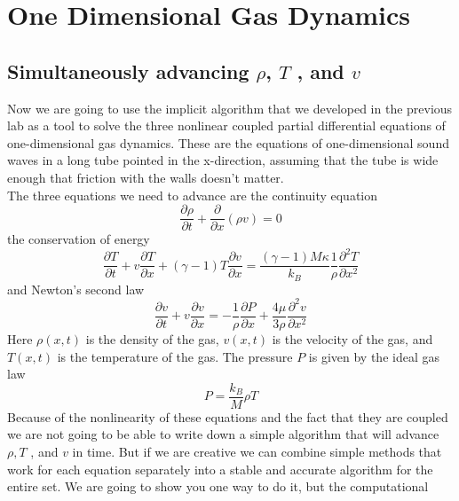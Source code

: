 
\chapter*{One Dimensional Gas Dynamics}
\section*{Simultaneously advancing $\rho$, $T$ , and $v$}
Now we are going to use the implicit algorithm that we developed in the previous
lab as a tool to solve the three nonlinear coupled partial differential equations
of one-dimensional gas dynamics. These are the equations of one-dimensional
sound waves in a long tube pointed in the x-direction, assuming that the tube is
wide enough that friction with the walls doesn\rq t matter. \\ 
The three equations we need to advance are the continuity equation
\begin{equation}\label{eq:1101}
\frac{\partial \rho}{\partial t}+\frac{\partial}{\partial x}(\rho v)=0
\end{equation}
the conservation of energy
\begin{equation}\label{eq:1102}
\frac{\partial T}{\partial t}+v \frac{\partial T}{\partial x}+(\gamma-1) T \frac{\partial v}{\partial x}=\frac{(\gamma-1) M \kappa}{k_{B}} \frac{1}{\rho} \frac{\partial^{2} T}{\partial x^{2}}
\end{equation}
and Newton\rq s second law
\begin{equation}\label{eq:1103}
\frac{\partial v}{\partial t}+v \frac{\partial v}{\partial x}=-\frac{1}{\rho} \frac{\partial P}{\partial x}+\frac{4 \mu}{3 \rho} \frac{\partial^{2} v}{\partial x^{2}}
\end{equation}
Here $\rho(x,t)$ is the density of the gas, $v(x,t)$ is the velocity of the gas, and $T(x,t)$ is
the temperature of the gas. The pressure $P$ is given by the ideal gas law
\begin{equation}\label{eq:1104}
P=\frac{k_{B}}{M} \rho T
\end{equation}
Because of the nonlinearity of these equations and the fact that they are
coupled we are not going to be able to write down a simple algorithm that will advance $\rho, T$ , and $v$ in time. But if we are creative we can combine simple methods
that work for each equation separately into a stable and accurate algorithm for
the entire set. We are going to show you one way to do it, but the computational
